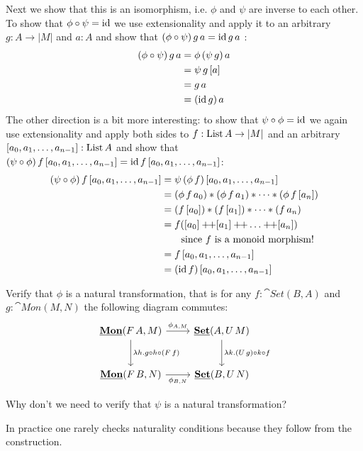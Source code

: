Next we show that this is an isomorphism, i.e. $\phi$ and $\psi$ are inverse to each other. To show that $\phi \circ \psi = \mathrm{id}$ we use extensionality and apply it to an arbitrary $g : A \to |M|$ and $a : A$ and show that $ (\phi \circ \psi)\,g\,a = \mathrm{id}\,g\,a$ : 
\begin{align*}
  (\phi \circ \psi)\,g\,a
& = \phi\,(\psi\, g)\,a\\
& = \psi\,g\,[a]\\
& = g\,a\\
& = (\mathrm{id}\,g)\,a
\end{align*}
The other direction is a bit more interesting: to show that $\psi \circ \phi = \mathrm{id}$ we again use extensionality and apply both sides to $f : \mathrm{List}\,A \to |M|$ and an arbitrary $[a_0,a_1,\dots,a_{n-1}] : \mathrm{List}\,A$ and show that $(\psi \circ \phi)\,f\,[a_0,a_1,\dots,a_{n-1}]  = \mathrm{id}\,f\,[a_0,a_1,\dots,a_{n-1}]$:
\begin{align*}
  (\psi \circ \phi)\,f\,[a_0,a_1,\dots,a_{n-1}] 
 & = \psi\,(\phi\,f)\, [a_0,a_1,\dots,a_{n-1}] \\
 & = (\phi\,f\,a_0) * (\phi\,f\,a_1) * \dots * (\phi\,f\,[a_n])\\
 & = (f\,[a_0]) * (f\,[a_1]) * \dots * (f\,a_n)\\
 & = f ([a_0] \app [a_1] \app \dots \app [a_n]) \\
 &\qquad \mbox{since $f$ is a monoid morphism!} \\
& = f\, [a_0,a_1,\dots,a_{n-1}] \\
& = (\id\,f)\,[a_0,a_1,\dots,a_{n-1}] 
\end{align*}

\begin{Exercise}
  Verify that $\phi$ is a natural transformation, that is for any $f : \cat{Set}(B,A)$ and $g:\cat{Mon}(M,N)$ the following diagram commutes:
  \[\begin{tikzcd}[row sep = large]
    \cat{Mon}(F\,A,M) \arrow[r,"\phi_{A,M}"] \arrow[d,"\lambda h. g\circ h \circ (F\,f)"] & \cat{\Set}(A,U\,M)  \arrow[d,"\lambda k. (U\,g)\circ k \circ f"] \\
    \cat{Mon}(F\,B,N) \arrow[r,"\phi_{B,N}" below]  & \cat{\Set}(B,U\,N)  
\end{tikzcd}\]
\end{Exercise}
\begin{question}
  Why don't we need to verify that $\psi$ is a natural transformation?
\end{question}
In practice one rarely checks naturality conditions because they follow from the construction. 

